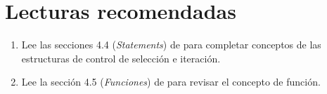 \section{Lecturas recomendadas}

\begin{enumerate}

\item Lee las secciones 4.4 (\emph{Statements})
      de \pppbook{}
      para completar conceptos de las estructuras
      de control de selección e iteración.

\item Lee la sección 4.5 (\emph{Funciones}) 
      de \pppbook{}
      para revisar el concepto de función.

\end{enumerate}
